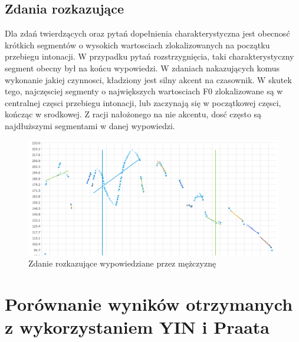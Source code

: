 \documentclass[a4paper,12 pt]{article}
\begin{document}
\subsection{Zdania rozkazujące}
Dla zdań twierdzących oraz pytań dopełnienia charakterystyczna jest obecnosć krótkich segmentów o wysokich wartosciach zlokalizowanych na początku przebiegu intonacji. W przypadku pytań rozstrzygnięcia, taki charakterystyczny segment obecny był na końcu wypowiedzi. W zdaniach nakazujących komus wykonanie jakiej czynnosci, kładziony jest silny akcent na czasownik. W skutek tego, najczęsciej segmenty o największych wartosciach F0 zlokalizowane są w centralnej częsci przebiegu intonacji, lub zaczynają się w początkowej częsci, kończąc w srodkowej. Z racji nałożonego na nie akcentu, dosć często są najdłuższymi segmentami w danej wypowiedzi.
 \FloatBarrier
\begin{figure}[h]
\centering
\includegraphics[scale=0.7]{rozkaz_dom.png}
\caption{Zdanie rozkazujące wypowiedziane przez mężczyznę}
\end{figure}
\FloatBarrier
\section{Porównanie wyników otrzymanych z wykorzystaniem YIN i Praata}
\end{document}
